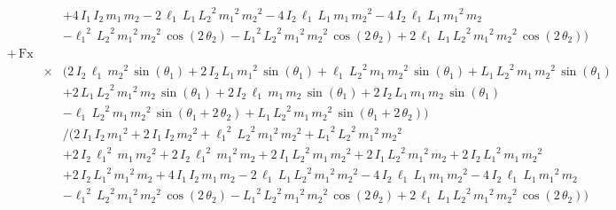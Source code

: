 \documentclass[a4paper,11pt]{jsarticle}
\begin{document}
\begin{align*}
      \\ & & &+
      4\,I_{1}\,I_{2}\,m_{1}\,m_{2}-
      2\,\ell_{1}\,L_1\,{L_2}^2\,{m_{1}}^2\,{m_{2}}^2-
      4\,I_{2}\,\ell_{1}\,L_1\,m_{1}\,{m_{2}}^2-
      4\,I_{2}\,\ell_{1}\,L_1\,{m_{1}}^2\,m_{2}
      \\ & & &-
      {\ell_{1}}^2\,{L_2}^2\,{m_{1}}^2\,{m_{2}}^2\,\cos\left(2\,\theta_2\right)-
      {L_1}^2\,{L_2}^2\,{m_{1}}^2\,{m_{2}}^2\,\cos\left(2\,\theta_2\right)+
      2\,\ell_{1}\,L_1\,{L_2}^2\,{m_{1}}^2\,{m_{2}}^2\,\cos\left(2\,\theta_2\right)
    \Bigg)
  \\
  & +\,\mathrm{Fx} & &
  \\
    & & \times &
    \Bigg(
      2\,I_{2}\,\ell_{1}\,{m_{2}}^2\,\sin\left(\theta_1\right)+
      2\,I_{2}\,L_1\,{m_{1}}^2\,\sin\left(\theta_1\right)+
      \ell_{1}\,{L_2}^2\,m_{1}\,{m_{2}}^2\,\sin\left(\theta_1\right)+
      L_1\,{L_2}^2\,m_{1}\,{m_{2}}^2\,\sin\left(\theta_1\right)
      \\ & & &+
      2\,L_1\,{L_2}^2\,{m_{1}}^2\,m_{2}\,\sin\left(\theta_1\right)+
      2\,I_{2}\,\ell_{1}\,m_{1}\,m_{2}\,\sin\left(\theta_1\right)+
      2\,I_{2}\,L_1\,m_{1}\,m_{2}\,\sin\left(\theta_1\right)
      \\ & & &-
      \ell_{1}\,{L_2}^2\,m_{1}\,{m_{2}}^2\,\sin\left(\theta_1+
      2\,\theta_2\right)+
      L_1\,{L_2}^2\,m_{1}\,{m_{2}}^2\,\sin\left(\theta_1+
      2\,\theta_2\right)
    \Bigg)
    \\
    & & &\Bigg/
    \Bigg(
      2\,I_{1}\,I_{2}\,{m_{1}}^2+
      2\,I_{1}\,I_{2}\,{m_{2}}^2+
      {\ell_{1}}^2\,{L_2}^2\,{m_{1}}^2\,{m_{2}}^2+
      {L_1}^2\,{L_2}^2\,{m_{1}}^2\,{m_{2}}^2
      \\ & & &+
      2\,I_{2}\,{\ell_{1}}^2\,m_{1}\,{m_{2}}^2+
      2\,I_{2}\,{\ell_{1}}^2\,{m_{1}}^2\,m_{2}+
      2\,I_{1}\,{L_2}^2\,m_{1}\,{m_{2}}^2+
      2\,I_{1}\,{L_2}^2\,{m_{1}}^2\,m_{2}+
      2\,I_{2}\,{L_1}^2\,m_{1}\,{m_{2}}^2
      \\ & & &+
      2\,I_{2}\,{L_1}^2\,{m_{1}}^2\,m_{2}+
      4\,I_{1}\,I_{2}\,m_{1}\,m_{2}-
      2\,\ell_{1}\,L_1\,{L_2}^2\,{m_{1}}^2\,{m_{2}}^2-
      4\,I_{2}\,\ell_{1}\,L_1\,m_{1}\,{m_{2}}^2-
      4\,I_{2}\,\ell_{1}\,L_1\,{m_{1}}^2\,m_{2}
      \\ & & &-
      {\ell_{1}}^2\,{L_2}^2\,{m_{1}}^2\,{m_{2}}^2\,\cos\left(2\,\theta_2\right)-
      {L_1}^2\,{L_2}^2\,{m_{1}}^2\,{m_{2}}^2\,\cos\left(2\,\theta_2\right)+
      2\,\ell_{1}\,L_1\,{L_2}^2\,{m_{1}}^2\,{m_{2}}^2\,\cos\left(2\,\theta_2\right)
    \Bigg)
  \\

\end{align*}
\end{document}
